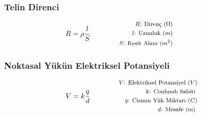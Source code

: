 \subsubsection*{Telin Direnci}
\begin{equation}
    R = \rho \frac{l}{S} \qquad \qquad \parbox{4cm}{\footnotesize$\begin{aligned}
        R\text{: Direnç } (\Omega) \\
        l\text{: Uzunluk } (m) \\
        S\text{: Kesit Alanı } (m^2)
\end{aligned}$}
\end{equation}

\subsubsection*{Noktasal Yükün Elektriksel Potansiyeli}
\begin{equation}
    V = k \frac{q}{d} \qquad \qquad \parbox{4cm}{\footnotesize$\begin{aligned}
        V\text{: Elektriksel Potansiyel } (V) \\
        k\text{: Coulumb Sabiti } \\
        q\text{: Cismin Yük Miktarı } (C) \\
        d\text{: Mesafe (m) }
\end{aligned}$}
\end{equation}

